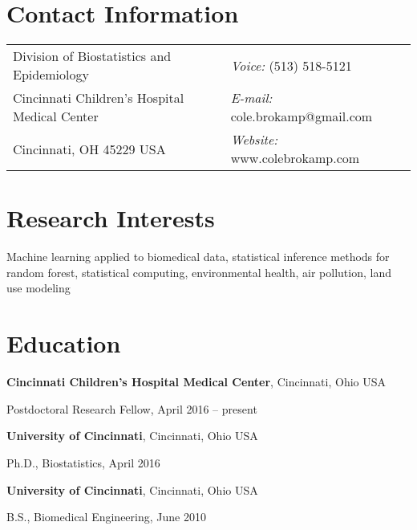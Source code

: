 \documentclass[margin,line]{res}
\newenvironment{list1}{
  \begin{list}{\ding{113}}{%
      \setlength{\itemsep}{0in}
      \setlength{\parsep}{0in} \setlength{\parskip}{0in}
      \setlength{\topsep}{0in} \setlength{\partopsep}{0in} 
      \setlength{\leftmargin}{0.17in}}}{\end{list}}
\begin{document}

\begin{resume}
\section{\sc Contact Information}
\vspace{.05in}
\begin{tabular}{@{}p{3in}p{4in}}
Division of Biostatistics and Epidemiology & {\it Voice:}  (513) 518-5121 \\
Cincinnati Children's Hospital Medical Center & {\it E-mail:}  cole.brokamp@gmail.com\\
Cincinnati, OH 45229 USA  & {\it Website:} www.colebrokamp.com \\
\end{tabular}


\section{\sc Research Interests}
Machine learning applied to biomedical data, statistical inference methods for random forest,
statistical computing, environmental health, air pollution, land use modeling

\section{\sc Education}

{\bf Cincinnati Children's Hospital Medical Center}, Cincinnati, Ohio USA \\
\vspace*{-.1in}
\begin{list1}
    \item[]Postdoctoral Research Fellow, April 2016 -- present
\end{list1}

{\bf University of Cincinnati}, Cincinnati, Ohio USA \\
\vspace*{-.1in}
\begin{list1}
\item[]Ph.D., Biostatistics, April 2016
\end{list1}

{\bf University of Cincinnati}, Cincinnati, Ohio USA\\
\vspace*{-.1in}
\begin{list1}
\item[]B.S., Biomedical Engineering,  June 2010
\end{list1}



\end{resume}
\end{document}
